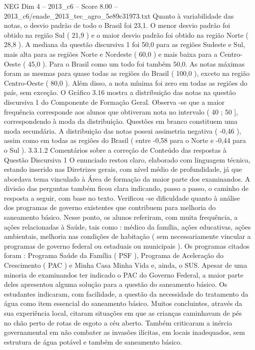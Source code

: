 \begin{textsample}{NEG Dim 4 – 2013\_c6 – Score 8.00 – 2013\_c6/enade\_2013\_tec\_agro\_5e89c31973.txt}
Quanto à variabilidade das notas, o desvio padrão de todo o Brasil foi 23,1.
O menor desvio padrão foi obtido na região Sul ( 21,9 ) e o maior desvio padrão foi obtido na região Norte ( 28,8 ).
A mediana da questão discursiva 1 foi 50,0 para as regiões Sudeste e Sul, mais alta para as regiões Norte e Nordeste ( 60,0 ) e mais baixa para a Centro-Oeste ( 45,0 ).
Para o Brasil como um todo foi também 50,0.
As notas máximas foram as mesmas para quase todas as regiões do Brasil ( 100,0 ), exceto na região Centro-Oeste ( 80,0 ).
Além disso, a nota mínima foi zero em todas as regiões do país, sem exceção.
O Gráfico 3.16 mostra a distribuição das notas na questão discursiva 1 do Componente de Formação Geral.
Observa -se que a maior frequência corresponde aos alunos que obtiveram nota no intervalo ( 40 ; 50 ], correspondendo à moda da distribuição.
Questões em branco constituem uma moda secundária.
A distribuição das notas possui assimetria negativa ( -0,46 ), assim como em todas as regiões do Brasil ( entre -0,58 para o Norte e -0,44 para o Sul ). 3.3.1.2 Comentários sobre a correção de Conteúdo das respostas à Questão Discursiva 1 O enunciado restou claro, elaborado com linguagem técnica, estando inserido nas Diretrizes gerais, com nível médio de profundidade, já que abordava tema vinculado à Área de formação da maior parte dos examinandos.
A divisão das perguntas também ficou clara indicando, passo a passo, o caminho de resposta a seguir, com base no texto.
Verificou -se dificuldade quanto à análise dos programas de governo existentes que contribuem para melhoria do saneamento básico.
Nesse ponto, os alunos referiram, com muita frequência, a ações relacionadas à Saúde, tais como : médico da família, ações educativas, ações ambientais, melhoria nas condições de habitação ( sem necessariamente vincular a programas de governo federal ou estaduais ou municipais ).
Os programas citados foram : Programa Saúde da Família ( PSF ), Programa de Aceleração do Crescimento ( PAC ) e Minha Casa Minha Vida e, ainda, o SUS.
Apesar de uma minoria de examinandos ter indicado o PAC do Governo Federal, a maior parte deles apresentou alguma solução para a questão do saneamento básico.
Os estudantes indicaram, com facilidade, a questão da necessidade do tratamento da água como item essencial do saneamento básico.
Muitos concluintes, através da sua experiência local, citaram situações em que as crianças caminhavam de pés no chão perto de rotas de esgoto a céu aberto.
Também criticaram a inércia governamental em não combater as invasões ilícitas, em locais inadequados, sem estrutura de água potável e também de saneamento básico.

\end{textsample}
